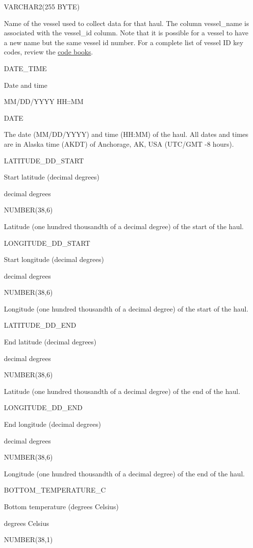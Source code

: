 \documentclass[
  letterpaper,
  oneside,
  open=any]{scrbook}
\begin{document}
VARCHAR2(255 BYTE)

Name of the vessel used to collect data for that haul. The column
vessel\_name is associated with the vessel\_id column. Note that it is
possible for a vessel to have a new name but the same vessel id number.
For a complete list of vessel ID key codes, review the
\href{https://www.fisheries.noaa.gov/resource/document/groundfish-survey-species-code-manual-and-data-codes-manual}{code
books}.

DATE\_TIME

Date and time

MM/DD/YYYY HH::MM

DATE

The date (MM/DD/YYYY) and time (HH:MM) of the haul. All dates and times
are in Alaska time (AKDT) of Anchorage, AK, USA (UTC/GMT -8 hours).

LATITUDE\_DD\_START

Start latitude (decimal degrees)

decimal degrees

NUMBER(38,6)

Latitude (one hundred thousandth of a decimal degree) of the start of
the haul.

LONGITUDE\_DD\_START

Start longitude (decimal degrees)

decimal degrees

NUMBER(38,6)

Longitude (one hundred thousandth of a decimal degree) of the start of
the haul.

LATITUDE\_DD\_END

End latitude (decimal degrees)

decimal degrees

NUMBER(38,6)

Latitude (one hundred thousandth of a decimal degree) of the end of the
haul.

LONGITUDE\_DD\_END

End longitude (decimal degrees)

decimal degrees

NUMBER(38,6)

Longitude (one hundred thousandth of a decimal degree) of the end of the
haul.

BOTTOM\_TEMPERATURE\_C

Bottom temperature (degrees Celsius)

degrees Celsius

NUMBER(38,1)
\end{document}
